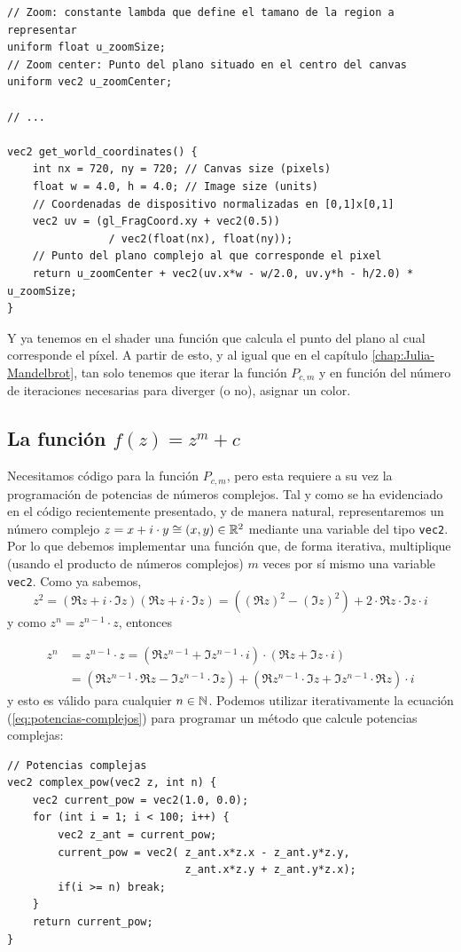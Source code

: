 \begin{lstlisting}
// Zoom: constante lambda que define el tamano de la region a representar
uniform float u_zoomSize;
// Zoom center: Punto del plano situado en el centro del canvas
uniform vec2 u_zoomCenter;

// ... 

vec2 get_world_coordinates() {
    int nx = 720, ny = 720; // Canvas size (pixels)
    float w = 4.0, h = 4.0; // Image size (units) 
    // Coordenadas de dispositivo normalizadas en [0,1]x[0,1]
    vec2 uv = (gl_FragCoord.xy + vec2(0.5)) 
                / vec2(float(nx), float(ny));
    // Punto del plano complejo al que corresponde el pixel
    return u_zoomCenter + vec2(uv.x*w - w/2.0, uv.y*h - h/2.0) * u_zoomSize;
}
\end{lstlisting}


Y ya tenemos en el shader una función que calcula el punto del plano al cual corresponde el píxel. A partir de esto, y al igual que en el capítulo \ref{chap:Julia-Mandelbrot}, tan solo tenemos que iterar la función $P_{c,m}$ y en función del número de iteraciones necesarias para diverger (o no), asignar un color.

\subsection{La función $f(z)=z^m+c$}

Necesitamos código para la función $P_{c,m}$, pero esta requiere a su vez la programación de potencias de números complejos. Tal y como se ha evidenciado en el código recientemente presentado, y de manera natural, representaremos un número complejo $z=x+i\cdot y\cong (x,y)\in\mathbb{R}^2$ mediante una variable del tipo \verb|vec2|. Por lo que debemos implementar una función que, de forma iterativa, multiplique (usando el producto de números complejos) $m$ veces por sí mismo una variable \verb|vec2|. Como ya sabemos,
$$
z^2 = (\Re z+i\cdot \Im z)(\Re z+i\cdot \Im z) = ((\Re z)^2-(\Im z)^2) + 2\cdot\Re z\cdot\Im z\cdot i
$$
y como $z^n = z^{n-1}\cdot z$, entonces

\begin{equation}
    \label{eq:potencias-complejos}
    \begin{split}
        z^n & = z^{n-1}\cdot z = (\Re z^{n-1} + \Im z^{n-1}\cdot i)\cdot(\Re z + \Im z\cdot i) \\
        & = \left(\Re z^{n-1}\cdot\Re z - \Im z^{n-1}\cdot \Im z\right) + \left(\Re z^{n-1}\cdot\Im z + \Im z^{n-1}\cdot\Re z\right)\cdot i 
    \end{split}
\end{equation}
y esto es válido para cualquier $n\in\mathbb{N}$. Podemos utilizar iterativamente la ecuación (\ref{eq:potencias-complejos}) para programar un método que calcule potencias complejas:
\begin{lstlisting}
// Potencias complejas
vec2 complex_pow(vec2 z, int n) {
    vec2 current_pow = vec2(1.0, 0.0);
    for (int i = 1; i < 100; i++) {
        vec2 z_ant = current_pow;
        current_pow = vec2( z_ant.x*z.x - z_ant.y*z.y, 
                            z_ant.x*z.y + z_ant.y*z.x);
        if(i >= n) break;
    }
    return current_pow;
}
\end{lstlisting}

